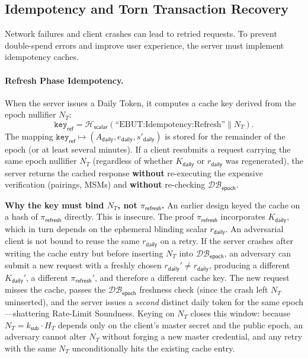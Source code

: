 \documentclass[11pt]{article}
\theoremstyle{definitionstyle}
\theoremstyle{plain}
\newcommand{\DB}{\mathcal{DB}}
\begin{document}
\subsection{Idempotency and Torn Transaction Recovery}
\label{sec:idempotency}

Network failures and client crashes can lead to retried requests. To prevent double-spend errors and improve user experience, the server must implement idempotency caches.

\paragraph{Refresh Phase Idempotency.}
When the server issues a Daily Token, it computes a cache key derived from the epoch nullifier $N_T$:
\[
\mathtt{key}_{\mathsf{ref}} = \mathcal{H}_{\mathsf{scalar}}\!\left(\text{``EBUT:Idempotency:Refresh''} \parallel N_T \right).
\]
The mapping $\mathtt{key}_{\mathsf{ref}} \mapsto (A_{\mathsf{daily}}, e_{\mathsf{daily}}, s'_{\mathsf{daily}})$ is stored for the remainder of the epoch (or at least several minutes). If a client resubmits a request carrying the same epoch nullifier $N_T$ (regardless of whether $K_{\mathsf{daily}}$ or $r_{\mathsf{daily}}$ was regenerated), the server returns the cached response \textbf{without} re-executing the expensive verification (pairings, MSMs) and \textbf{without} re-checking $\DB_{\mathsf{epoch}}$.

\textbf{Why the key must bind $N_T$, not $\pi_{\mathsf{refresh}}$.}
An earlier design keyed the cache on a hash of $\pi_{\mathsf{refresh}}$ directly.  This is insecure.  The proof $\pi_{\mathsf{refresh}}$ incorporates $K_{\mathsf{daily}}$, which in turn depends on the ephemeral blinding scalar $r_{\mathsf{daily}}$.  An adversarial client is not bound to reuse the same $r_{\mathsf{daily}}$ on a retry.  If the server crashes after writing the cache entry but before inserting $N_T$ into $\DB_{\mathsf{epoch}}$, an adversary can submit a new request with a freshly chosen $r_{\mathsf{daily}}' \neq r_{\mathsf{daily}}$, producing a different $K_{\mathsf{daily}}'$, a different $\pi_{\mathsf{refresh}}'$, and therefore a different cache key.  The new request misses the cache, passes the $\DB_{\mathsf{epoch}}$ freshness check (since the crash left $N_T$ uninserted), and the server issues a \emph{second} distinct daily token for the same epoch---shattering Rate-Limit Soundness.  Keying on $N_T$ closes this window: because $N_T = k_{\mathsf{sub}} \cdot H_T$ depends only on the client's master secret and the public epoch, an adversary cannot alter $N_T$ without forging a new master credential, and any retry with the same $N_T$ unconditionally hits the existing cache entry.
\end{document}
